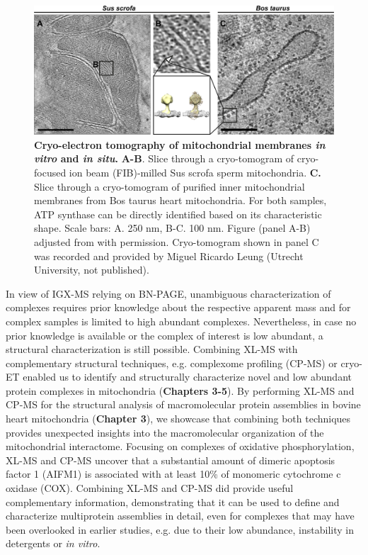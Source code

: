 \begin{figure}[hbt!]
    \center
    \includegraphics[width=\textwidth]{Chapter.6/Figures/Figure1.png}
    \caption{\textbf{Cryo-electron tomography of mitochondrial membranes \emph{in vitro} and \emph{in situ}.} \textbf{A-B}. Slice through a cryo-tomogram of cryo-focused ion beam (FIB)-milled Sus scrofa sperm mitochondria. \textbf{C.} Slice through a cryo-tomogram of purified inner mitochondrial membranes from Bos taurus heart mitochondria. For both samples, ATP synthase can be directly identified based on its characteristic shape. Scale bars: A. 250 nm, B-C. 100 nm. Figure (panel A-B) adjusted from \cite{RN2} with permission. Cryo-tomogram shown in panel C was recorded and provided by Miguel Ricardo Leung (Utrecht University, not published).}
    \label{fig:ch6_fig1}
\end{figure}
In view of IGX-MS relying on BN-PAGE, unambiguous characterization of complexes requires prior knowledge about the respective apparent mass and for complex samples is limited to high abundant complexes.
Nevertheless, in case no prior knowledge is available or the complex of interest is low abundant, a structural characterization is still possible. Combining XL-MS with complementary structural techniques, e.g. complexome profiling (CP-MS) or cryo-ET enabled us to identify and structurally characterize novel and low abundant protein complexes in mitochondria (\textbf{Chapters 3-5}). By performing XL-MS and CP-MS for the structural analysis of macromolecular protein assemblies in bovine heart mitochondria (\textbf{Chapter 3}), we showcase that combining both techniques provides unexpected insights into the macromolecular organization of the mitochondrial interactome. Focusing on complexes of oxidative phosphorylation, XL-MS and CP-MS uncover that a substantial amount of dimeric apoptosis factor 1 (AIFM1) is associated with at least 10\% of monomeric cytochrome c oxidase (COX). Combining XL-MS and CP-MS did provide useful complementary information, demonstrating that it can be used to define and characterize multiprotein assemblies in detail, even for complexes that may have been overlooked in earlier studies, e.g. due to their low abundance, instability in detergents or \emph{in vitro}.
